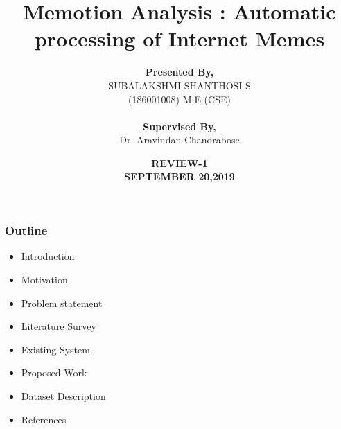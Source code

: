 \documentclass[]{beamer}
\begin{document}
\title[Meme Emotion Analysis]{\textbf{Memotion Analysis : Automatic processing of Internet Memes} }

\author[SUBALAKSHMI(186001008)]{ \textbf{ Presented By,}\\  SUBALAKSHMI SHANTHOSI S \\(186001008) M.E (CSE) \\~\\  \textbf{Supervised By,} \\ Dr. Aravindan Chandrabose}
\date{\textbf{REVIEW-1 \\ SEPTEMBER 20,2019} }


\begin{frame}
\titlepage
\end{frame}


\begin{frame}\frametitle{Outline}
\begin{itemize}
\item Introduction
\item Motivation
\item Problem statement
\item Literature Survey
\item Existing System
\item Proposed Work
\item Dataset Description
\item References
\end{itemize}
\end{frame}
\end{document}

